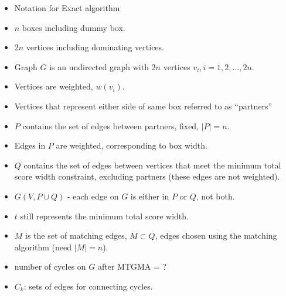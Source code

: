 \documentclass[oribibl]{llncs}
\begin{document}
\begin{itemize}
	\item Notation for Exact algorithm
	\item $n$ boxes including dummy box.
	\item $2n$ vertices including dominating vertices.
	\item Graph $G$ is an undirected graph with $2n$ vertices $v_i, i = 1, 2, ...,2n$.
	\item Vertices are weighted, $w(v_i)$.
	\item Vertices that represent either side of same box referred to as ``partners''
	\item $P$ contains the set of edges between partners, fixed, $|P| = n$.
	\item Edges in $P$ are weighted, corresponding to box width.
	\item $Q$ contains the set of edges between vertices that meet the minimum total score width constraint, excluding partners (these edges are not weighted).
	\item $G(V, P \cup Q)$ - each edge on $G$ is either in $P$ or $Q$, not both.
	\item $t$ still represents the minimum total score width.
	\item $M$ is the set of matching edges, $M \subset Q$, edges chosen using the matching algorithm (need $|M| = n$).
	\item number of cycles on $G$ after MTGMA =  ?
	\item $C_k$: sets of edges for connecting cycles.
	
\end{itemize}
\end{document}

